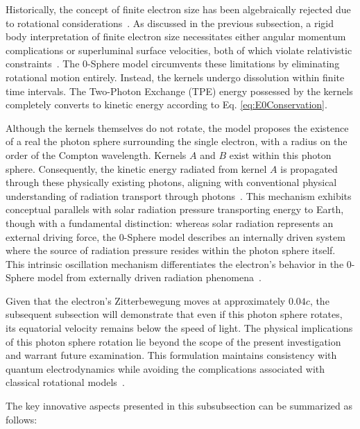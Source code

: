 \documentclass[%
 reprint,
 amsmath,amssymb,
 aps,
]{revtex4-1}
\numberwithin{equation}{section}%
\begin{document}
Historically, the concept of finite electron size has been algebraically rejected due to rotational considerations~\cite{MacGregor1992}. As discussed in the previous subsection, a rigid body interpretation of finite electron size necessitates either angular momentum complications or superluminal surface velocities, both of which violate relativistic constraints~\cite{Barut1994}. The 0-Sphere model circumvents these limitations by eliminating rotational motion entirely. Instead, the kernels undergo dissolution within finite time intervals. The Two-Photon Exchange (TPE) energy possessed by the kernels completely converts to kinetic energy according to Eq. \ref{eq:E0Conservation}.

Although the kernels themselves do not rotate, the model proposes the existence of a real the photon sphere surrounding the single electron, with a radius on the order of the Compton wavelength. Kernels $A$ and $B$ exist within this photon sphere. Consequently, the kinetic energy radiated from kernel $A$ is propagated through these physically existing photons, aligning with conventional physical understanding of radiation transport through photons~\cite{Cohen1997}. This mechanism exhibits conceptual parallels with solar radiation pressure transporting energy to Earth, though with a fundamental distinction: whereas solar radiation represents an external driving force, the 0-Sphere model describes an internally driven system where the source of radiation pressure resides within the photon sphere itself. This intrinsic oscillation mechanism differentiates the electron's behavior in the 0-Sphere model from externally driven radiation phenomena~\cite{Jackson1998}.

Given that the electron's Zitterbewegung moves at approximately $0.04c$, the subsequent subsection will demonstrate that even if this photon sphere rotates, its equatorial velocity remains below the speed of light. The physical implications of this photon sphere rotation lie beyond the scope of the present investigation and warrant future examination. This formulation maintains consistency with quantum electrodynamics while avoiding the complications associated with classical rotational models~\cite{Hestenes1990}.

The key innovative aspects presented in this subsubsection can be summarized as follows:
\end{document}
